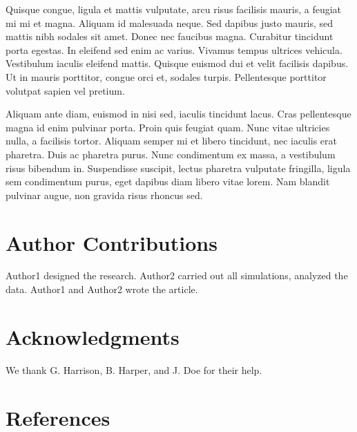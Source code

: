 \documentclass[
  oneside,
  open=any]{scrbook}
\newlength{\cslhangindent}
\newlength{\cslentryspacingunit} %
\newenvironment{CSLReferences}[2] %
 {%
  \setlength{\parindent}{0pt}
  \ifodd #1
  \let\oldpar\par
  \def\par{\hangindent=\cslhangindent\oldpar}
  \fi
  \setlength{\parskip}{#2\cslentryspacingunit}
 }%
 {}
\begin{document}
Quisque congue, ligula et mattis vulputate, arcu risus facilisis mauris,
a feugiat mi mi et magna. Aliquam id malesuada neque. Sed dapibus justo
mauris, sed mattis nibh sodales sit amet. Donec nec faucibus magna.
Curabitur tincidunt porta egestas. In eleifend sed enim ac varius.
Vivamus tempus ultrices vehicula. Vestibulum iaculis eleifend mattis.
Quisque euismod dui et velit facilisis dapibus. Ut in mauris porttitor,
congue orci et, sodales turpis. Pellentesque porttitor volutpat sapien
vel pretium.

Aliquam ante diam, euismod in nisi sed, iaculis tincidunt lacus. Cras
pellentesque magna id enim pulvinar porta. Proin quis feugiat quam. Nunc
vitae ultricies nulla, a facilisis tortor. Aliquam semper mi et libero
tincidunt, nec iaculis erat pharetra. Duis ac pharetra purus. Nunc
condimentum ex massa, a vestibulum risus bibendum in. Suspendisse
suscipit, lectus pharetra vulputate fringilla, ligula sem condimentum
purus, eget dapibus diam libero vitae lorem. Nam blandit pulvinar augue,
non gravida risus rhoncus sed.

\hypertarget{author-contributions}{%
\chapter{Author Contributions}\label{author-contributions}}

Author1 designed the research. Author2 carried out all simulations,
analyzed the data. Author1 and Author2 wrote the article.

\hypertarget{acknowledgments}{%
\chapter{Acknowledgments}\label{acknowledgments}}

We thank G. Harrison, B. Harper, and J. Doe for their help.

\hypertarget{references}{%
\chapter{References}\label{references}}

\hypertarget{refs}{}
\begin{CSLReferences}{0}{0}
\end{CSLReferences}


\backmatter
\end{document}
